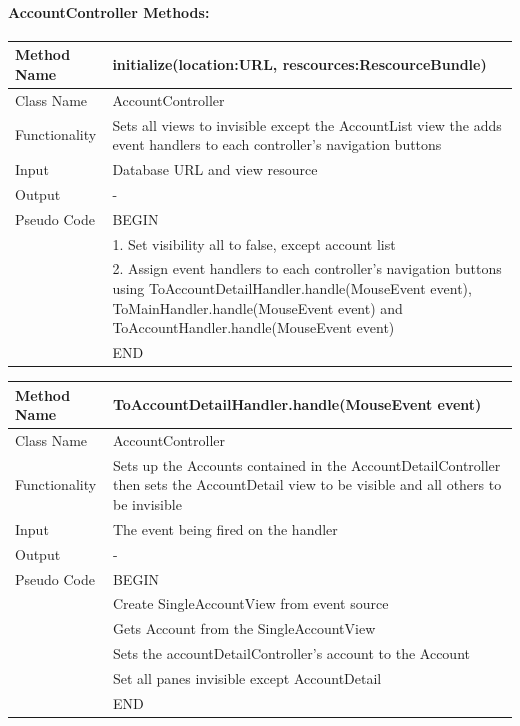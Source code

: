\documentclass[12pt]{article}
\begin{document}
\paragraph{AccountController Methods:}


\begin{tabular}{ |p{3cm}||p{\colWidth}|  }
	\hline
	Method Name &  initialize(location:URL, rescources:RescourceBundle) \\
	\hline
	Class Name & AccountController\\
	\hline
	Functionality & Sets all views to invisible except the AccountList view the adds event handlers to each controller's navigation buttons\\
	\hline
	Input & Database URL and view resource\\
	\hline
	Output & -\\
	\hline
	Pseudo Code & BEGIN\\
	&	1. Set visibility all to false, except account list \\
	& 	2. Assign event handlers to each controller's navigation buttons using ToAccountDetailHandler.handle(MouseEvent event), ToMainHandler.handle(MouseEvent event) and ToAccountHandler.handle(MouseEvent event) \\
	& END\\
	\hline
\end{tabular} 


\begin{tabular}{ |p{3cm}||p{\colWidth}|  }
	\hline
	Method Name & ToAccountDetailHandler.handle(MouseEvent event)\\
	\hline
	Class Name & AccountController\\
	\hline
	Functionality & Sets up the Accounts contained in the AccountDetailController then sets the AccountDetail view to be visible and all others to be invisible\\
	\hline
	Input & The event being fired on the handler\\
	\hline
	Output & -\\
	\hline
	Pseudo Code & BEGIN\\
	& Create SingleAccountView from event source\\
	& Gets Account from the SingleAccountView\\
	& Sets the accountDetailController's account to the Account\\
	& Set all panes invisible except AccountDetail \\
	& END\\
	\hline
\end{tabular} 
\end{document}
